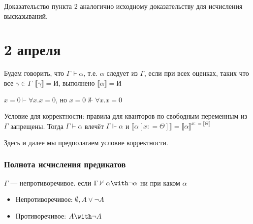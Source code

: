 \begin{remark}
    Доказательство пункта 2 аналогично исходному доказательству для исчисления высказываний.
\end{remark}

\chapter{2 апреля}

\begin{definition}
    Будем говорить, что \(\Gamma \Vdash \alpha\), т.е. \(\alpha\) следует из \(\Gamma\), если при всех оценках, таких что все \(\gamma \in \Gamma \ \ \llbracket \gamma \rrbracket = \text{И}\), выполнено \(\llbracket \alpha \rrbracket = \text{И}\)
\end{definition}

\begin{example}
    \(x = 0 \vdash \forall x.x = 0\), но \(x = 0 \nVdash \forall x.x = 0\)
\end{example}

Условие для корректности: правила для кванторов по свободным переменным из \(\Gamma\) запрещены. Тогда \(\Gamma \vdash \alpha\) влечёт \(\Gamma \Vdash \alpha\) и \(\llbracket \alpha [x: = \Theta] \rrbracket = \llbracket \alpha \rrbracket^{x: = \llbracket \Theta \rrbracket}\)

\begin{remark}
    Здесь и далее мы предполагаем условие корректности.
\end{remark}

\subsection{Полнота исчисления предикатов}

\begin{definition}
    \(\Gamma\) --- непротиворечивое. если \(\Gamma \nvdash \alpha \with \neg \alpha\) ни при каком \(\alpha\)
\end{definition}

\begin{example}\itemfix
    \begin{itemize}
        \item Непротиворечивое: \(\emptyset, A \lor \neg A\)
        \item Противоречивое: \(A \with \neg A\)
    \end{itemize}
\end{example}

